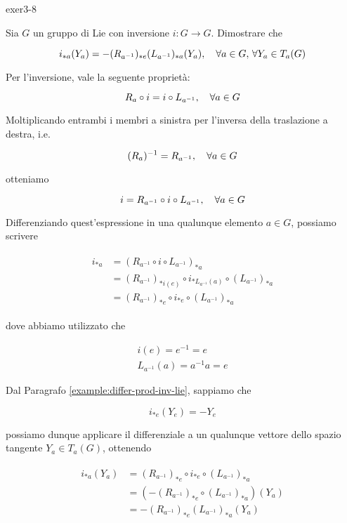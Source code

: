 {exer3-8}
{
Sia $ G $ un gruppo di Lie con inversione $ i : G \to G $. Dimostrare che

\begin{equation}
	i_{*a}(Y_{a}) = -(R_{a^{-1}})_{*e}(L_{a^{-1}})_{*a} (Y_{a}) %
	\qcomma \forall a \in G, \, \forall Y_{a} \in T_{a}(G)
\end{equation}
}
{
Per l'inversione, vale la seguente proprietà:

\begin{equation}
	R_{a} \circ i = i \circ L_{a^{-1}} \qcomma \forall a \in G
\end{equation}

Moltiplicando entrambi i membri a sinistra per l'inversa della traslazione a destra, i.e.

\begin{equation}
	(R_{a})^{-1} = R_{a^{-1}} \qcomma \forall a \in G
\end{equation}

otteniamo

\begin{equation}
	i = R_{a^{-1}} \circ i \circ L_{a^{-1}} \qcomma \forall a \in G
\end{equation}

Differenziando quest'espressione in una qualunque elemento $ a \in G $, possiamo scrivere

\begin{align}
	\begin{split}
		i_{*a} &= (R_{a^{-1}} \circ i \circ L_{a^{-1}})_{*a} \\
		&= (R_{a^{-1}})_{*i(e)} \circ i_{*L_{a^{-1}}(a)} \circ (L_{a^{-1}})_{*a} \\
		&= (R_{a^{-1}})_{*e} \circ i_{*e} \circ (L_{a^{-1}})_{*a}
	\end{split}
\end{align}

dove abbiamo utilizzato che

\begin{gather}
	i(e) = e^{-1} = e \\
	L_{a^{-1}}(a) = a^{-1} a = e
\end{gather}

Dal Paragrafo \ref{example:differ-prod-inv-lie}, sappiamo che

\begin{equation}
	i_{*e} (Y_{e}) = - Y_{e}
\end{equation}

possiamo dunque applicare il differenziale a un qualunque vettore dello spazio tangente $ Y_{a} \in T_{a}(G) $, ottenendo

\begin{align}
	\begin{split}
		i_{*a}(Y_{a}) &= (R_{a^{-1}})_{*e} \circ i_{*e} \circ (L_{a^{-1}})_{*a} \\
		&= (- (R_{a^{-1}})_{*e} \circ (L_{a^{-1}})_{*a}) (Y_{a}) \\
		&= - (R_{a^{-1}})_{*e} (L_{a^{-1}})_{*a} (Y_{a})
	\end{split}
\end{align}
}


